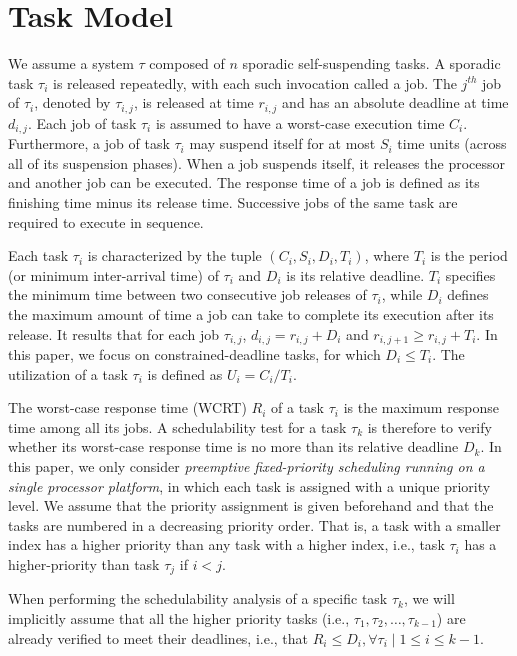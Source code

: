\section{Task Model}


We assume a system $\tau$ composed of $n$ sporadic self-suspending tasks. A sporadic task $\tau_i$ is released repeatedly, with each such invocation called a
job. The $j^{th}$ job of $\tau_i$, denoted by $\tau_{i,j}$, is released
at time $r_{i,j}$ and has an absolute deadline at time $d_{i,j}$. Each
job of task $\tau_i$ is assumed to have a worst-case execution time $C_i$. Furthermore, a job of task $\tau_i$ may suspend itself for at most $S_i$ time units (across all of its suspension phases). When a job suspends itself, it releases the processor and another job can be executed. The response time of a job is defined as its finishing time minus its release
time. Successive jobs of the same task are required to execute in
sequence. 

Each task $\tau_i$ is characterized by the tuple $(C_i, S_i, D_i, T_i)$, where $T_i$ is the period (or minimum inter-arrival time) of $\tau_i$ and $D_i$ is its relative deadline. $T_i$ specifies the minimum time between two consecutive job releases of
$\tau_i$, while $D_i$ defines the maximum
amount of time a job can take to complete its execution after its
release. It results that for each job $\tau_{i,j}$, $d_{i,j}=r_{i,j}+D_i$ and $r_{i,j+1} \geq r_{i,j} + T_i$. In this paper, we focus on constrained-deadline tasks, for which
$D_i \leq T_i$. The utilization of a task $\tau_i$ is defined as $U_i=C_i/T_i$. 

The worst-case response time (WCRT) $R_i$ of a task $\tau_i$ is the maximum response time among all its
jobs. A schedulability test for a task $\tau_k$
is therefore to verify whether its worst-case response time is no more than its relative deadline $D_k$.
In this paper, we only consider \emph{preemptive fixed-priority scheduling running on a single processor platform}, in
which each task is assigned with a unique priority level. We assume
that the priority assignment is given beforehand and that the tasks are numbered in a decreasing priority order. That is, a task with a smaller index has a higher priority than any task with a higher index, i.e., task $\tau_i$ has a higher-priority than task $\tau_{j}$ if $i < j$. 

When performing the schedulability analysis of a specific task $\tau_k$, we will implicitly assume that all the higher priority tasks (i.e., $\tau_1, \tau_2, \ldots, \tau_{k-1}$) are already verified to meet their deadlines, i.e., that $R_i \leq D_i, \forall \tau_i \mid 1 \leq i \leq k-1$. 




